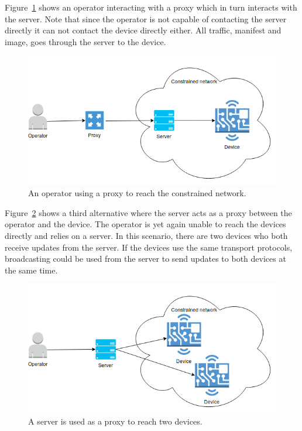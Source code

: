 \documentclass[0-thesis.tex]{subfiles}
\begin{document}
Figure~\ref{fig:operator-proxy} shows an operator interacting with a proxy which in turn
interacts with the server. Note that since the operator is not capable of contacting the
server directly it can not contact the device directly either. All traffic, manifest and
image, goes through the server to the device. 

\begin{figure}
    \caption{An operator using a proxy to reach the constrained network.}
    \label{fig:operator-proxy}
    \includegraphics[scale=0.7]{images/operator-proxy.png}
\end{figure}

Figure~\ref{fig:operator-server} shows a third alternative where the server acts as a
proxy between the operator and the device. The operator is yet again unable to reach the
devices directly and relies on a server. In this scenario, there are two devices who both
receive updates from the server. If the devices use the same transport protocols,
broadcasting could be used from the server to send updates to both devices at the same
time.

\begin{figure}
    \caption{A server is used as a proxy to reach two devices.}
    \label{fig:operator-server}
    \includegraphics[scale=0.8]{images/operator-server.png}
\end{figure}
\end{document}
